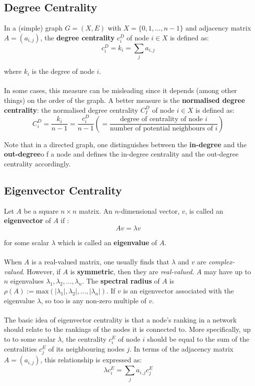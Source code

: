 \documentclass[a4paper,11pt]{article}
\begin{document}
\subsection{Degree Centrality}
In a (simple) graph $G=(X,E)$ with $X=\{ 0, 1, \dots, n-1 \}$ and adjacency matrix $A=(a_{i,j})$, the \textbf{degree centrality} $c_i^D$ of node $i \in X$ is defined as:
\[
    c_i^D = k_i = \sum_j a_{i,j}
\]

where $k_i$ is the degree of node $i$.
\\\\
In some cases, this measure can be misleading since it depends (among other things) on the order of the graph.
A better measure is the \textbf{normalised degree centrality}: the normalised degree centrality $C_I^D$ of node $i \in X$ is defined as:
\[
    C_i^D = \frac{k_i}{n-1} = \frac{c_i^D}{n-1} \left( = \frac{\text{degree of centrality of node } i}{\text{number of potential neighbours of } i} \right)
\]

Note that in a directed graph, one distinguishes between the \textbf{in-degree} and the \textbf{out-degree}o f a node and defines the in-degree centrality and the out-degree centrality accordingly.

\subsection{Eigenvector Centrality}
Let $A$ be a square $n \times n$ matrix.
An $n$-dimensional vector, $v$, is called an \textbf{eigenvector} of $A$ if :
\[
    Av = \lambda v
\]

for some scalar $\lambda$ which is called an \textbf{eigenvalue} of $A$.
\\\\
When $A$ is a real-valued matrix, one usually finds that $\lambda$ and $v$ are \textit{complex-valued}.
However, if $A$ is \textbf{symmetric}, then they are \textit{real-valued}.
$A$ may have up to $n$ eigenvalues $\lambda_1, \lambda_2, \dots, \lambda_n$.
The \textbf{spectral radius} of $A$ is $\rho(A) := \text{max}(|\lambda_1|, \lambda_2|, \dots, |\lambda_n|)$.
If $v$ is an eigenvector associated with the eigenvalue $\lambda$, so too is any non-zero multiple of $v$.
\\\\
The basic idea of eigenvector centrality is that a node's ranking in a network should relate to the rankings of the nodes it is connected to.
More specifically,  up to to some scalar $\lambda$, the centrality $c_i^E$ of node $i$ should be equal to the sum of the centralities $c_j^E$ of its neighbouring nodes $j$.
In terms of the adjacency matrix $A = (a_{i,j})$, this relationship is expressed as:
\[
    \lambda c_i^E = \sum_j a_{i,j} c_j^E
\]
\end{document}
